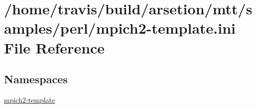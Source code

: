 \hypertarget{mpich2-template_8ini}{\section{/home/travis/build/arsetion/mtt/samples/perl/mpich2-\/template.ini File Reference}
\label{mpich2-template_8ini}
}
\subsection*{Namespaces}
\begin{DoxyCompactItemize}
\item 
\hyperlink{namespacempich2-template}{mpich2-\/template}
\end{DoxyCompactItemize}

